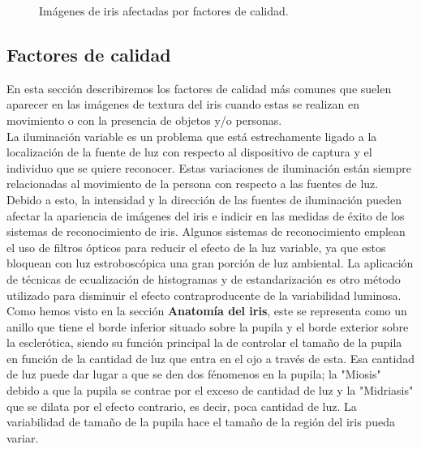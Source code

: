 \begin{figure}[htbp]
\centering
{}
\caption{Imágenes de iris afectadas por factores de calidad.} \label{fig:señales}
\end{figure}


\subsection{Factores de calidad}

En esta sección describiremos los factores de calidad más comunes que suelen aparecer en las imágenes de textura del iris cuando estas se realizan en movimiento o con la presencia de objetos y/o personas. \\

La iluminación variable es un problema que está estrechamente ligado a la localización de la fuente de luz con respecto al dispositivo de captura y el individuo que se quiere reconocer. Estas variaciones de iluminación están siempre relacionadas al movimiento de la persona con respecto a las fuentes de luz. Debido a esto, la intensidad y la dirección de las fuentes de iluminación pueden afectar la apariencia de imágenes del iris e indicir en las medidas de éxito de los sistemas de reconocimiento de iris. Algunos sistemas de reconocimiento emplean el uso de filtros ópticos para reducir el efecto de la luz variable, ya que estos bloquean con luz estroboscópica una gran porción de luz ambiental. La aplicación de técnicas de ecualización de histogramas y  de estandarización es otro método utilizado para disminuir el efecto contraproducente de la variabilidad luminosa. \\

Como hemos visto en la sección \textbf{Anatomía del iris}, este se representa como un anillo que tiene el borde inferior situado sobre la pupila y el borde exterior sobre la esclerótica, siendo su función principal la de controlar el tamaño de la pupila en función de la cantidad de luz que entra en el ojo a través de esta.  Esa cantidad de luz puede dar lugar a que se den dos fénomenos en la pupila; la "Miosis" debido a que la pupila se contrae por el exceso de cantidad de luz y la "Midriasis" que se dilata por el efecto contrario, es decir, poca cantidad de luz. La variabilidad de tamaño de la pupila hace el tamaño de la región del iris pueda variar. \\

